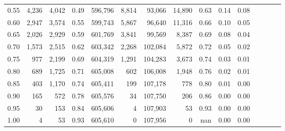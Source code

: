 \begin{tabular}{rrrcrrrrrrrrrrr}
0.55 &    4,236 &   4,042 &                                       0.49 &  596,796 &    8,814 &   93,066 &   14,890 &  0.63 &  0.14 &                         0.08 \\
0.60 &    2,947 &   3,574 &                                       0.55 &  599,743 &    5,867 &   96,640 &   11,316 &  0.66 &  0.10 &                         0.05 \\
0.65 &    2,026 &   2,929 &                                       0.59 &  601,769 &    3,841 &   99,569 &    8,387 &  0.69 &  0.08 &                         0.04 \\
0.70 &    1,573 &   2,515 &                                       0.62 &  603,342 &    2,268 &  102,084 &    5,872 &  0.72 &  0.05 &                         0.02 \\
0.75 &      977 &   2,199 &                                       0.69 &  604,319 &    1,291 &  104,283 &    3,673 &  0.74 &  0.03 &                         0.01 \\
0.80 &      689 &   1,725 &                                       0.71 &  605,008 &      602 &  106,008 &    1,948 &  0.76 &  0.02 &                         0.01 \\
0.85 &      403 &   1,170 &                                       0.74 &  605,411 &      199 &  107,178 &      778 &  0.80 &  0.01 &                         0.00 \\
0.90 &      165 &     572 &                                       0.78 &  605,576 &       34 &  107,750 &      206 &  0.86 &  0.00 &                         0.00 \\
0.95 &       30 &     153 &                                       0.84 &  605,606 &        4 &  107,903 &       53 &  0.93 &  0.00 &                         0.00 \\
1.00 &        4 &      53 &                                       0.93 &  605,610 &        0 &  107,956 &        0 &   nan &  0.00 &                         0.00 \\
\bottomrule
\end{tabular}
